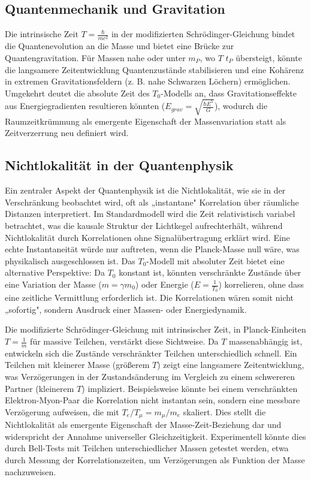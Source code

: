 \documentclass[a4paper,12pt]{article}
\begin{document}
	\subsection{Quantenmechanik und Gravitation}
	Die intrinsische Zeit \( T = \frac{\hbar}{m c^2} \) in der modifizierten Schrödinger-Gleichung bindet die Quantenevolution an die Masse und bietet eine Brücke zur Quantengravitation. Für Massen nahe oder unter \( m_P \), wo \( T \) \( t_P \) übersteigt, könnte die langsamere Zeitentwicklung Quantenzustände stabilisieren und eine Kohärenz in extremen Gravitationsfeldern (z. B. nahe Schwarzen Löchern) ermöglichen. Umgekehrt deutet die absolute Zeit des \( T_0 \)-Modells an, dass Gravitationseffekte aus Energiegradienten resultieren könnten (\( E_{grav} = \sqrt{\frac{\hbar E^5}{G}} \)), wodurch die Raumzeitkrümmung als emergente Eigenschaft der Massenvariation statt als Zeitverzerrung neu definiert wird.
	
	\subsection{Nichtlokalität in der Quantenphysik}
	Ein zentraler Aspekt der Quantenphysik ist die Nichtlokalität, wie sie in der Verschränkung beobachtet wird, oft als „instantane" Korrelation über räumliche Distanzen interpretiert. Im Standardmodell wird die Zeit relativistisch variabel betrachtet, was die kausale Struktur der Lichtkegel aufrechterhält, während Nichtlokalität durch Korrelationen ohne Signalübertragung erklärt wird. Eine echte Instantaneität würde nur auftreten, wenn die Planck-Masse null wäre, was physikalisch ausgeschlossen ist. Das \( T_0 \)-Modell mit absoluter Zeit bietet eine alternative Perspektive: Da \( T_0 \) konstant ist, könnten verschränkte Zustände über eine Variation der Masse (\( m = \gamma m_0 \)) oder Energie (\( E = \frac{1}{T_0} \)) korrelieren, ohne dass eine zeitliche Vermittlung erforderlich ist. Die Korrelationen wären somit nicht „sofortig", sondern Ausdruck einer Massen- oder Energiedynamik.
	
	Die modifizierte Schrödinger-Gleichung mit intrinsischer Zeit, in Planck-Einheiten \( T = \frac{1}{m} \) für massive Teilchen, verstärkt diese Sichtweise. Da \( T \) massenabhängig ist, entwickeln sich die Zustände verschränkter Teilchen unterschiedlich schnell. Ein Teilchen mit kleinerer Masse (größerem \( T \)) zeigt eine langsamere Zeitentwicklung, was Verzögerungen in der Zustandsänderung im Vergleich zu einem schwereren Partner (kleinerem \( T \)) impliziert. Beispielsweise könnte bei einem verschränkten Elektron-Myon-Paar die Korrelation nicht instantan sein, sondern eine messbare Verzögerung aufweisen, die mit \( T_e / T_\mu = m_\mu / m_e \) skaliert. Dies stellt die Nichtlokalität als emergente Eigenschaft der Masse-Zeit-Beziehung dar und widerspricht der Annahme universeller Gleichzeitigkeit. Experimentell könnte dies durch Bell-Tests mit Teilchen unterschiedlicher Massen getestet werden, etwa durch Messung der Korrelationszeiten, um Verzögerungen als Funktion der Masse nachzuweisen.
	
\end{document}
